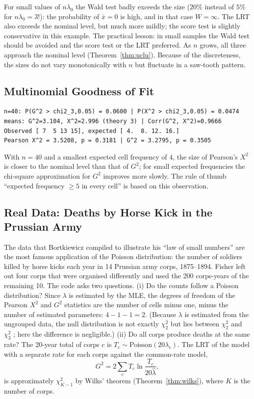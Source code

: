 \documentclass[main.tex]{subfiles}
\begin{document}
For small values of $n\lambda_0$ the Wald test badly exceeds the size ($20\%$ instead of $5\%$ for $n\lambda_0=3$!): the probability of $\bar x=0$ is high, and in that case $W=\infty$. The LRT also exceeds the nominal level, but much more mildly; the score test is slightly conservative in this example. The practical lesson: in small samples the Wald test should be avoided and the score test or the LRT preferred. As $n$ grows, all three approach the nominal level (Theorem~\ref{thm:uclu}). Because of the discreteness, the sizes do not vary monotonically with $n$ but fluctuate in a saw-tooth pattern.

\subsection{Multinomial Goodness of Fit}

\begin{lstlisting}[style=output]
n=40: P(G^2 > chi2_3,0.05) = 0.0600 | P(X^2 > chi2_3,0.05) = 0.0474
means: G^2=3.104, X^2=2.996 (theory 3) | Corr(G^2, X^2)=0.9666
Observed [ 7  5 13 15], expected [ 4.  8. 12. 16.]
Pearson X^2 = 3.5208, p = 0.3181 | G^2 = 3.2795, p = 0.3505
\end{lstlisting}

With $n=40$ and a smallest expected cell frequency of $4$, the size of Pearson's $X^2$ is closer to the nominal level than that of $G^2$; for small expected frequencies the chi-square approximation for $G^2$ improves more slowly. The rule of thumb ``expected frequency $\ge5$ in every cell'' is based on this observation.

\subsection{Real Data: Deaths by Horse Kick in the Prussian Army}\label{sec:at-tekmesi}
The data that Bortkiewicz compiled to illustrate his ``law of small numbers'' \cite{bortkiewicz98} are the most famous application of the Poisson distribution: the number of soldiers killed by horse kicks each year in 14 Prussian army corps, 1875--1894. Fisher left out four corps that were organised differently and used the 200 corps-years of the remaining 10. The code asks two questions. (i) Do the counts follow a Poisson distribution? Since $\lambda$ is estimated by the MLE, the degrees of freedom of the Pearson $X^2$ and $G^2$ statistics are the number of cells minus one, minus the number of estimated parameters: $4-1-1=2$. (Because $\lambda$ is estimated from the ungrouped data, the null distribution is not exactly $\chi^2_2$ but lies between $\chi^2_2$ and $\chi^2_3$ \cite{chernoff-lehmann54}; here the difference is negligible.) (ii) Do all corps produce deaths at the same rate? The 20-year total of corps $c$ is $T_c\sim\text{Poisson}(20\lambda_c)$. The LRT of the model with a separate rate for each corps against the common-rate model,
\[
G^2=2\sum_cT_c\ln\frac{T_c}{20\hat\lambda},
\]
is approximately $\chi^2_{K-1}$ by Wilks' theorem (Theorem~\ref{thm:wilks}), where $K$ is the number of corps.
\end{document}
